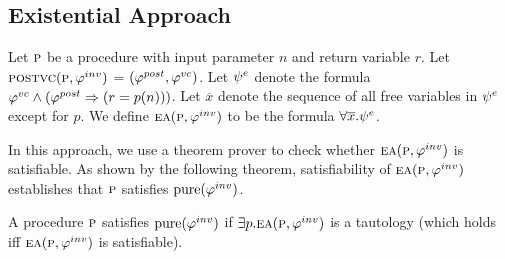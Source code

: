 \subsection{Existential Approach}

Let $\textsc{p}$ be a procedure with input parameter $n$ and return variable $r$.
Let $\textsc{postvc}({\textsc{p}},{\varphi^{inv}})$ = $(\varphi^{post},\varphi^{vc})$.
Let $\psi^e$ denote the formula $\varphi^{vc} \wedge (\varphi^{post} \Rightarrow (r = p(n)))$.
Let $\overline{x}$ denote the sequence of all free variables in $\psi^e$ except for $p$.
We define $\textsc{ea}(\textsc{p},\varphi^{inv})$ to be the formula $ \forall \overline{x}. \psi^e$.

In this approach, we use a theorem prover to check whether $\textsc{ea}(\textsc{p},\varphi^{inv})$ is satisfiable.
As shown by the following theorem, satisfiability of $\textsc{ea}(\textsc{p},\varphi^{inv})$ establishes that $\textsc{p}$
satisfies $\mathrm{pure}(\varphi^{inv})$.

\begin{theorem}
\label{theorem:EA}
A procedure $\textsc{p}$ satisfies $\mathrm{pure}(\varphi^{inv})$ if
$\exists p. \textsc{ea}(\textsc{p},\varphi^{inv})$ is a tautology
(which holds iff $\textsc{ea}(\textsc{p},\varphi^{inv})$ is satisfiable).
\end{theorem}

